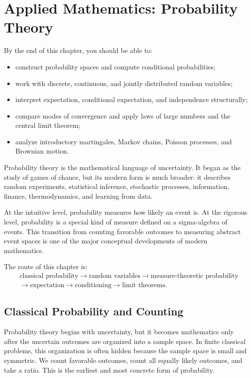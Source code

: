 \chapter{Applied Mathematics: Probability Theory}

\begin{learningobjectives}
By the end of this chapter, you should be able to:
\begin{itemize}
    \item construct probability spaces and compute conditional probabilities;
    \item work with discrete, continuous, and jointly distributed random variables;
    \item interpret expectation, conditional expectation, and independence structurally;
    \item compare modes of convergence and apply laws of large numbers and the central limit theorem;
    \item analyze introductory martingales, Markov chains, Poisson processes, and Brownian motion.
\end{itemize}
\end{learningobjectives}

Probability theory is the mathematical language of uncertainty. It began as the study of games of chance, but its modern form is much broader: it describes random experiments, statistical inference, stochastic processes, information, finance, thermodynamics, and learning from data.

At the intuitive level, probability measures how likely an event is. At the rigorous level, probability is a special kind of measure defined on a sigma-algebra of events. This transition from counting favorable outcomes to measuring abstract event spaces is one of the major conceptual developments of modern mathematics.

The route of this chapter is:
\[
    \begin{aligned}
        &\text{classical probability} \to \text{random variables} \to \text{measure-theoretic probability} \\
        &\to \text{expectation} \to \text{conditioning} \to \text{limit theorems}.
    \end{aligned}
\]

\section{Classical Probability and Counting}


Probability theory begins with uncertainty, but it becomes mathematics only after the uncertain outcomes are organized into a sample space. In finite classical problems, this organization is often hidden because the sample space is small and symmetric. We count favorable outcomes, count all equally likely outcomes, and take a ratio. This is the earliest and most concrete form of probability.

